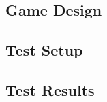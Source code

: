 	


\newpage
   
    	
   
   \newpage
\appendix
\chapter{ }
\section{Game Design}\label{game_design}
	
\section{Test Setup}\label{test_setup}
	
\section{Test Results}\label{test_results}
	
	

